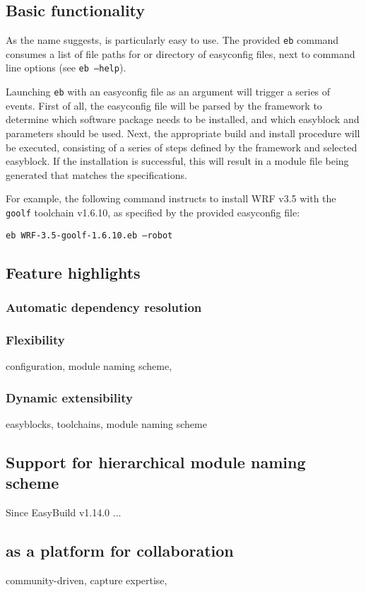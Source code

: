 \subsection{Basic functionality}

As the name suggests, \easybuild{} is particularly easy to use. The provided
\texttt{eb} command consumes a list of file paths for or directory of easyconfig
files, next to command line options (see \texttt{eb --help}).

Launching \texttt{eb} with an easyconfig file as an argument will trigger a
series of events. First of all, the easyconfig file will be parsed by the \easybuild{}
framework to determine which software package needs to be installed, and which
easyblock and parameters should be used. Next, the appropriate build and install
procedure will be executed, consisting of a series of steps defined by the framework
and selected easyblock. If the installation is successful, this will result in a 
module file being generated that matches the specifications.

For example, the following command instructs \easybuild{} to install WRF v3.5
with the \texttt{goolf} toolchain v1.6.10, as specified by the provided easyconfig
file:

\texttt{eb WRF-3.5-goolf-1.6.10.eb --robot}

\subsection{Feature highlights}

\subsubsection{Automatic dependency resolution}

\subsubsection{Flexibility}
\label{sec:eb_flexible}

configuration, module naming scheme,

\subsubsection{Dynamic extensibility}
\label{sec:eb_extensible}

easyblocks, toolchains, module naming scheme


\subsection{Support for hierarchical module naming scheme}

Since EasyBuild v1.14.0 ...


\subsection{\easybuild{} as a platform for collaboration}

community-driven, capture expertise,
